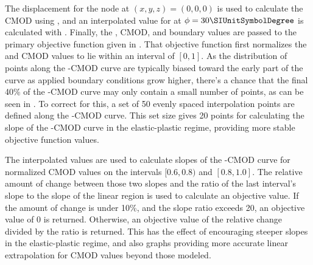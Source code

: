 The displacement for the node at \((x, y, z) = (0, 0, 0)\) is used to calculate the CMOD using , and an interpolated value for \J at \(\phi=30{\SIUnitSymbolDegree}\) is calculated with .
Finally, the \J, CMOD, and boundary values are passed to the primary objective function given in .
That objective function first normalizes the \J and CMOD values to lie within an interval of \([0, 1]\).
As the distribution of points along the \J-CMOD curve are typically biased toward the early part of the curve as applied boundary conditions grow higher, there's a chance that the final 40\% of the \J-CMOD curve may only contain a small number of points, as can be seen in .
To correct for this, a set of 50 evenly spaced interpolation points are defined along the \J-CMOD curve.
This set size gives 20 points for calculating the slope of the \J-CMOD curve in the elastic-plastic regime, providing more stable objective function values.

The interpolated values are used to calculate slopes of the \J-CMOD curve for normalized CMOD values on the intervals \([0.6, 0.8)\) and \([0.8, 1.0]\).
The relative amount of change between those two slopes and the ratio of the last interval's slope to the slope of the linear region is used to calculate an objective value.
If the amount of change is under 10\%, and the slope ratio exceeds 20, an objective value of 0 is returned.
Otherwise, an objective value of the relative change divided by the ratio is returned.
This has the effect of encouraging steeper slopes in the elastic-plastic regime, and also graphs providing more accurate linear extrapolation for CMOD values beyond those modeled.

